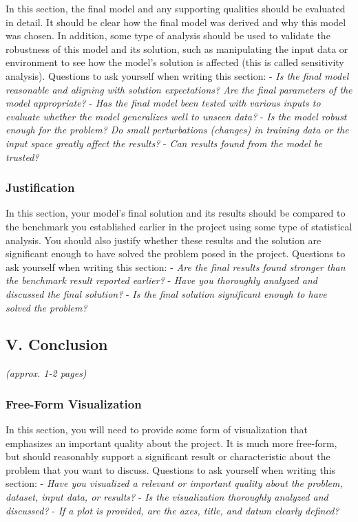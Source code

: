 \documentclass[
]{article}
\begin{document}
In this section, the final model and any supporting qualities should be
evaluated in detail. It should be clear how the final model was derived
and why this model was chosen. In addition, some type of analysis should
be used to validate the robustness of this model and its solution, such
as manipulating the input data or environment to see how the model's
solution is affected (this is called sensitivity analysis). Questions to
ask yourself when writing this section: - \emph{Is the final model
reasonable and aligning with solution expectations? Are the final
parameters of the model appropriate?} - \emph{Has the final model been
tested with various inputs to evaluate whether the model generalizes
well to unseen data?} - \emph{Is the model robust enough for the
problem? Do small perturbations (changes) in training data or the input
space greatly affect the results?} - \emph{Can results found from the
model be trusted?}

\hypertarget{justification}{%
\subsubsection{Justification}\label{justification}}

In this section, your model's final solution and its results should be
compared to the benchmark you established earlier in the project using
some type of statistical analysis. You should also justify whether these
results and the solution are significant enough to have solved the
problem posed in the project. Questions to ask yourself when writing
this section: - \emph{Are the final results found stronger than the
benchmark result reported earlier?} - \emph{Have you thoroughly analyzed
and discussed the final solution?} - \emph{Is the final solution
significant enough to have solved the problem?}

\hypertarget{v.-conclusion}{%
\subsection{V. Conclusion}\label{v.-conclusion}}

\emph{(approx. 1-2 pages)}

\hypertarget{free-form-visualization}{%
\subsubsection{Free-Form Visualization}\label{free-form-visualization}}

In this section, you will need to provide some form of visualization
that emphasizes an important quality about the project. It is much more
free-form, but should reasonably support a significant result or
characteristic about the problem that you want to discuss. Questions to
ask yourself when writing this section: - \emph{Have you visualized a
relevant or important quality about the problem, dataset, input data, or
results?} - \emph{Is the visualization thoroughly analyzed and
discussed?} - \emph{If a plot is provided, are the axes, title, and
datum clearly defined?}
\end{document}
